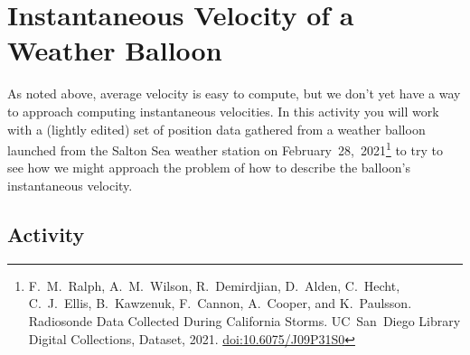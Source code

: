 \newpage
\section*{Instantaneous Velocity of a Weather Balloon}
\label{sec:balloon}

As noted above, average velocity is easy to compute, but we don't yet have a way to approach computing instantaneous velocities. In this activity you will work with a (lightly edited) set of position data gathered from a weather balloon launched from the Salton Sea weather station on February~28,~2021\footnote{F.~M.~Ralph, A.~M.~Wilson, R.~Demirdjian, D.~Alden, C.~Hecht, C.~J.~Ellis, B.~Kawzenuk, F.~Cannon, A.~Cooper, and K.~Paulsson. Radiosonde Data Collected During California Storms. UC~San~Diego Library Digital Collections, Dataset, 2021. \href{https://doi.org/10.6075/J09P31S0}{doi:10.6075/J09P31S0}} to try to see how we might approach the problem of how to describe the balloon's instantaneous velocity.

\subsection*{Activity}

